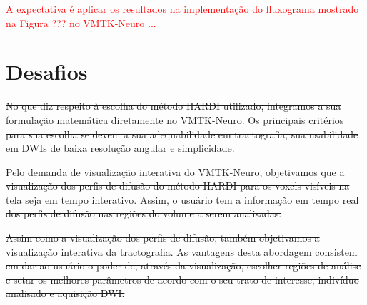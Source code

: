 \documentclass[
    12pt,                %
    oneside,            %
    a4paper,            %
    english,            %
    french,                %
    spanish,            %
    brazil                %
    ]{abntex2}
\begin{document}
\textcolor{red}{A expectativa é aplicar os resultados na implementação do fluxograma mostrado na Figura ??? no VMTK-Neuro ...}


\section{Desafios}
\label{sec::desafios}


\sout{No que diz respeito à escolha do método HARDI utilizado, integramos a sua formulação matemática diretamente no VMTK-Neuro. Os principais critérios para sua escolha se devem a sua adequabilidade em tractografia, sua usabilidade em DWIs de baixa resolução angular e simplicidade.}

\sout{Pelo demanda de visualização interativa do VMTK-Neuro, objetivamos que a visualização dos perfis de difusão do método HARDI para os voxels visíveis na tela seja em tempo interativo. Assim, o usuário tem a informação em tempo real dos perfis de difusão nas regiões do volume a serem analisadas.}

\sout{Assim como a visualização dos perfis de difusão, também objetivamos a visualização interativa da tractografia. As vantagens desta abordagem consistem em dar ao usuário o poder de, através da visualização, escolher regiões de análise e setar os melhores parâmetros de acordo com o seu trato de interesse, indivíduo analisado e aquisição DWI.}

%
%
%
\end{document}
